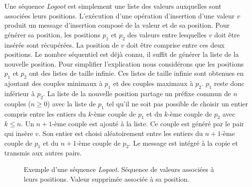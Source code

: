 Une séquence \emph{Logoot} est simplement une liste des valeurs auxquelles sont associées leurs positions.
L'exécution d'une opération d'insertion d'une valeur $v$ produit un message d'insertion composé de la valeur et de sa position.
Pour générer sa position, les positions $p_1$ et $p_2$ des valeurs entre lesquelles $v$ doit être insérée sont récupérées.
La position de $v$ doit être comprise entre ces deux positions.
Le nombre séquentiel est déjà connu, il suffit de générer la liste de la nouvelle position.
Pour simplifier l'explication nous considérons que les positions $p_1$ et $p_2$ ont des listes de taille infinie.
Ces listes de taille infinie sont obtenues en ajoutant des couples minimaux à $p_1$ et des couples maximaux à $p_2$.
$p_1$ reste donc inférieur à $p_2$.
La liste de la nouvelle position partage un préfixe commun de $n$ couples ($n \geq 0$) avec la liste de $p_1$ tel qu'il ne soit pas possible de choisir un entier compris entre les entiers du $k$-ème couple de $p_1$ et du $k$-ème couple de $p_2$ avec $k \leq n$.
Un $n+1$-ème couple est ajouté à la liste.
Ce couple est généré par le pair qui insère $v$.
Son entier est choisi aléatoirement entre les entiers du $n+1$-ème couple de $p_1$ et du $n+1$-ème couple de $p_2$.
Le message est intégré à la copie et transmis aux autres pairs.

\begin{figure}[tb]
\centering
\begin{subfigure}[b]{0.69\linewidth}
    \centering
    \caption{}\label{fig:logoot-1}
\end{subfigure}
\begin{subfigure}[b]{0.29\linewidth}
    \centering
    \caption{}\label{fig:logoot-2}
\end{subfigure}
\caption[Exemple d'une séquence \emph{Logoot}]{Exemple d'une séquence \emph{Logoot}.
 Séquence de valeurs associées à leurs positions.
 Valeur supprimée associée à sa position.}\label{fig:logoot}
\end{figure}

